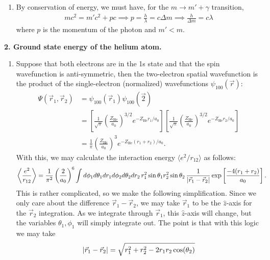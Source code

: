 \documentclass{book}
\theoremstyle{definition}
\newcommand{\f}[2]{\frac{#1}{#2}}
\newcommand{\lp}{\left(}
\newcommand{\rp}{\right)}
\newcommand{\lb}{\left[}
\newcommand{\rb}{\right]}
\begin{document}
\begin{enumerate}[label=(\alph*)]
	
	
	
	\item By conservation of energy, we must have, for the $m \to m' + \gamma$ transition,
	\begin{align*}
		mc^2 = m'c^2 + pc \implies p = \f{h}{\lambda} = c \Delta m  \implies \boxed{\f{h}{\Delta m} = c\lambda}
	\end{align*}
	where $p$ is the momentum of the photon and $m'<m$. 
\end{enumerate}



\noindent \textbf{2. Ground state energy of the helium atom.}


\begin{enumerate}[label=(\alph*)]
	\item Suppose that both electrons are in the 1s state and that the spin wavefunction is anti-symmetric, then the two-electron spatial wavefunction is the product of the single-electron (normalized) wavefunctions $\psi_{100}(\vec{r})$:
	\begin{align*}
		\Psi(\vec{r}_1, \vec{r}_2) 
		&= \psi_{100}(\vec{r}_1)\psi_{100}(\vec{2})\\
		&= \lb \f{1}{\sqrt{\pi}} \lp \f{Z_\text{He}}{a_0} \rp^{3/2}  e^{-Z_\text{He} r_1/a_0}\rb 
		\lb \f{1}{\sqrt{\pi}} \lp \f{Z_\text{He}}{a_0} \rp^{3/2}  e^{-Z_\text{He} r_2/a_0} \rb\\
		&= \f{1}{\pi} \lp \f{Z_\text{He}}{a_0} \rp^3 e^{-Z_\text{He}(r_1 + r_2)/a_0}.
	\end{align*}
	With this, we may calculate the interaction energy $\langle e^2/r_{12}\rangle$ as follows: 
	\begin{align*}
		\bigg\langle \f{e^2}{r_{12}}\bigg\rangle 
		&= \f{1}{\pi^2}\lp \f{2}{a_0} \rp^6 \int d\phi_1 d\theta_1 dr_1    d\phi_2 d\theta_2 dr_2 \, r_1^2\sin\theta_1  r_2^2\sin\theta_2 \, \f{1}{\abs{\vec{r}_1 - \vec{r}_2}}\exp\lb \f{-4 (r_1 + r_2)}{a_0} \rb.
	\end{align*}
	This is rather complicated, so we make the following simplification. Since we only care about the difference $\vec{r}_1 - \vec{r}_2$, we may take $\vec{r}_1$ to be the $\hat z$-axis for the $\vec{r}_2$ integration. As we integrate through $\vec{r}_1$, this $\hat{z}$-axis will change, but the variables $\theta_1,\phi_1$ will simply integrate out. The point is that with this logic we may take
	\begin{align*}
		\abs{\vec{r}_1 - \vec{r}_2} = \sqrt{r_1^2 + r_2^2 - 2r_1r_2\cos(\theta_2)} 
	\end{align*}

\end{enumerate}
\end{document}
